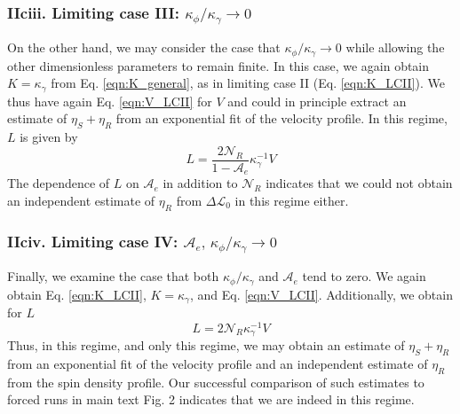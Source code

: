 \documentclass[%
 reprint,
superscriptaddress,
longbibliography,
 amsmath,amssymb,
 prl,
 citeautoscript,
]{revtex4-1}
\begin{document}
\subsubsection{IIciii. Limiting case III: $\kappa_{\phi}/\kappa_{\gamma} \rightarrow 0$}

On the other hand, we may consider the case that $\kappa_{\phi}/\kappa_{\gamma} \rightarrow 0$ while allowing the other dimensionless parameters to remain finite. In this case, we again obtain $K = \kappa_{\gamma}$ from Eq. \ref{eqn:K_general}, as in limiting case II (Eq. \ref{eqn:K_LCII}). We thus have again Eq. \ref{eqn:V_LCII} for $V$ and could in principle extract an estimate of $\eta_S + \eta_R$ from an exponential fit of the velocity profile. In this regime, $L$ is given by
\begin{equation}
L = \frac{2 \mathcal{N}_R}{1 - \mathcal{A}_e} \kappa_{\gamma}^{-1} V
\label{eqn:L_LCIII}
\end{equation}
The dependence of $L$ on $\mathcal{A}_e$ in addition to $\mathcal{N}_R$ indicates that we could not obtain an independent estimate of $\eta_R$ from $\Delta \mathcal{L}_0$ in this regime either.

\subsubsection{IIciv. Limiting case IV: $\mathcal{A}_e, \, \kappa_{\phi}/\kappa_{\gamma} \rightarrow 0$}

Finally, we examine the case that both $\kappa_{\phi} / \kappa_{\gamma}$ and $\mathcal{A}_e$ tend to zero. We again obtain Eq. \ref{eqn:K_LCII}, $K = \kappa_{\gamma}$, and Eq. \ref{eqn:V_LCII}. Additionally, we obtain for $L$
\begin{equation}
L = 2 \mathcal{N}_R \kappa_{\gamma}^{-1} V
\label{eqn:L_LCIV}
\end{equation}
Thus, in this regime, and only this regime, we may obtain an estimate of $\eta_S + \eta_R$ from an exponential fit of the velocity profile and an independent estimate of $\eta_R$ from the spin density profile. Our successful comparison of such estimates to forced runs in main text Fig. 2 indicates that we are indeed in this regime.
\end{document}
